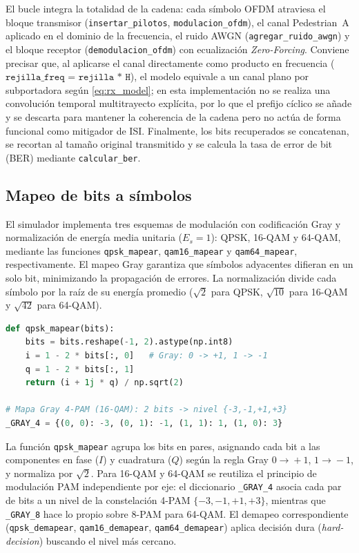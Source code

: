 \documentclass[conference,onecolumn]{IEEEtran}
\begin{document}
El bucle integra la totalidad de la cadena: cada s\'imbolo OFDM atraviesa el bloque transmisor (\texttt{insertar\_pilotos}, \texttt{modulacion\_ofdm}), el canal Pedestrian~A aplicado en el dominio de la frecuencia, el ruido AWGN (\texttt{agregar\_ruido\_awgn}) y el bloque receptor (\texttt{demodulacion\_ofdm}) con ecualizaci\'on \emph{Zero-Forcing}. Conviene precisar que, al aplicarse el canal directamente como producto en frecuencia ($\texttt{rejilla\_freq = rejilla * H}$), el modelo equivale a un canal plano por subportadora seg\'un \eqref{eq:rx_model}; en esta implementaci\'on no se realiza una convoluci\'on temporal multitrayecto expl\'icita, por lo que el prefijo c\'iclico se a\~nade y se descarta para mantener la coherencia de la cadena pero no act\'ua de forma funcional como mitigador de ISI. Finalmente, los bits recuperados se concatenan, se recortan al tama\~no original transmitido y se calcula la tasa de error de bit (BER) mediante \texttt{calcular\_ber}.

\subsection{Mapeo de bits a s\'imbolos}

El simulador implementa tres esquemas de modulaci\'on con codificaci\'on Gray y normalizaci\'on de energ\'ia media unitaria ($E_s = 1$): QPSK, 16-QAM y 64-QAM, mediante las funciones \texttt{qpsk\_mapear}, \texttt{qam16\_mapear} y \texttt{qam64\_mapear}, respectivamente. El mapeo Gray garantiza que s\'imbolos adyacentes difieran en un solo bit, minimizando la propagaci\'on de errores. La normalizaci\'on divide cada s\'imbolo por la ra\'iz de su energ\'ia promedio ($\sqrt{2}$ para QPSK, $\sqrt{10}$ para 16-QAM y $\sqrt{42}$ para 64-QAM).

\begin{lstlisting}[language=Python]
def qpsk_mapear(bits):
    bits = bits.reshape(-1, 2).astype(np.int8)
    i = 1 - 2 * bits[:, 0]   # Gray: 0 -> +1, 1 -> -1
    q = 1 - 2 * bits[:, 1]
    return (i + 1j * q) / np.sqrt(2)

# Mapa Gray 4-PAM (16-QAM): 2 bits -> nivel {-3,-1,+1,+3}
_GRAY_4 = {(0, 0): -3, (0, 1): -1, (1, 1): 1, (1, 0): 3}
\end{lstlisting}

La funci\'on \texttt{qpsk\_mapear} agrupa los bits en pares, asignando cada bit a las componentes en fase ($I$) y cuadratura ($Q$) seg\'un la regla Gray $0\!\rightarrow\!+1$, $1\!\rightarrow\!-1$, y normaliza por $\sqrt{2}$. Para 16-QAM y 64-QAM se reutiliza el principio de modulaci\'on PAM independiente por eje: el diccionario \texttt{\_GRAY\_4} asocia cada par de bits a un nivel de la constelaci\'on 4-PAM $\{-3,-1,+1,+3\}$, mientras que \texttt{\_GRAY\_8} hace lo propio sobre 8-PAM para 64-QAM. El demapeo correspondiente (\texttt{qpsk\_demapear}, \texttt{qam16\_demapear}, \texttt{qam64\_demapear}) aplica decisi\'on dura (\emph{hard-decision}) buscando el nivel m\'as cercano.
\end{document}
